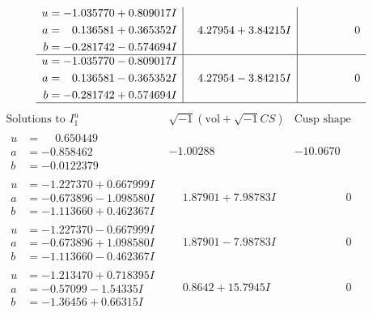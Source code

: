 \documentclass[1p]{elsarticle_modified}
\theoremstyle{definition}
\newcommand{\I}{\sqrt{-1}}
\begin{document}
$$\begin{array}{c|c|c}
\begin{aligned}
u &= -1.035770 + 0.809017 I \\
a &= \phantom{-}0.136581 + 0.365352 I \\
b &= -0.281742 - 0.574694 I\end{aligned}
 & \phantom{-}4.27954 + 3.84215 I & \phantom{-0.000000 } 0 \\ \hline\begin{aligned}
u &= -1.035770 - 0.809017 I \\
a &= \phantom{-}0.136581 - 0.365352 I \\
b &= -0.281742 + 0.574694 I\end{aligned}
 & \phantom{-}4.27954 - 3.84215 I & \phantom{-0.000000 } 0\\
 \hline 
 \end{array}$$\newpage$$\begin{array}{c|c|c}  
\text{Solutions to }I^u_{1}& \I (\text{vol} + \sqrt{-1}CS) & \text{Cusp shape}\\
 \hline 
\begin{aligned}
u &= \phantom{-}0.650449\phantom{ +0.000000I} \\
a &= -0.858462\phantom{ +0.000000I} \\
b &= -0.0122379\phantom{ +0.000000I}\end{aligned}
 & -1.00288\phantom{ +0.000000I} & -10.0670\phantom{ +0.000000I} \\ \hline\begin{aligned}
u &= -1.227370 + 0.667999 I \\
a &= -0.673896 - 1.098580 I \\
b &= -1.113660 + 0.462367 I\end{aligned}
 & \phantom{-}1.87901 + 7.98783 I & \phantom{-0.000000 } 0 \\ \hline\begin{aligned}
u &= -1.227370 - 0.667999 I \\
a &= -0.673896 + 1.098580 I \\
b &= -1.113660 - 0.462367 I\end{aligned}
 & \phantom{-}1.87901 - 7.98783 I & \phantom{-0.000000 } 0 \\ \hline\begin{aligned}
u &= -1.213470 + 0.718395 I \\
a &= -0.57099 - 1.54335 I \\
b &= -1.36456 + 0.66315 I\end{aligned}
 & \phantom{-}0.8642 + 15.7945 I & \phantom{-0.000000 } 0 \\ \hline\begin{aligned}

\end{aligned}
\end{array}$$
\end{document}
